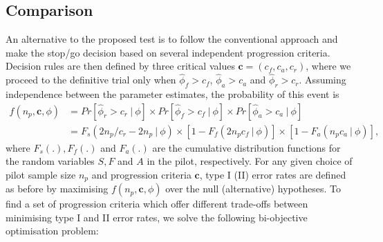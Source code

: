 \documentclass{article}
\begin{document}


\subsection{Comparison}\label{sec:comparator}

An alternative to the proposed test is to follow the conventional approach and make the stop/go decision based on several independent progression criteria. Decision rules are then defined by three critical values $\mathbf{c} = (c_f, c_a, c_r)$, where we proceed to the definitive trial only when $\hat{\phi}_f > c_f$, $\hat{\phi}_a > c_a$ and $\hat{\phi}_r > c_r$. Assuming independence between the parameter estimates, the probability of this event is
\begin{align*}
f(n_p, \mathbf{c}, \phi) &= Pr[\hat{\phi}_r > c_r ~ | ~ \phi] \times Pr[ \hat{\phi}_f > c_f ~ | ~ \phi] \times Pr[ \hat{\phi}_a > c_a ~ | ~ \phi] \\
&= F_s( 2n_p/c_r - 2n_p ~ | ~ \phi) \times [1-F_f(2n_p c_f ~ | ~ \phi)] \times [1-F_a(n_p c_a ~ | ~ \phi)],
\end{align*}
where $F_s(.), F_f(.)$ and $F_a(.)$ are the cumulative distribution functions for the random variables $S, F$ and $A$ in the pilot, respectively. For any given choice of pilot sample size $n_p$ and progression criteria $\mathbf{c}$, type I (II) error rates are defined as before by maximising $f(n_p, \mathbf{c}, \phi)$ over the null (alternative) hypotheses. To find a set of progression criteria which offer different trade-offs between minimising type I and II error rates, we solve the following bi-objective optimisation problem:
\end{document}
